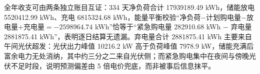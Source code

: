 全年收支可由两条独立账目互证：334 天净负荷合计 17939189.49 kWh，储能放电 5520412.99 kWh、充电 6815324.68 kWh，能量平衡校验“净负荷$-$计划购电量$-$放电量$+$充电量$=-2598964.74$ kWh”恰等于“紧急购电量 282910.68 kWh $-$ 弃电量 2881875.41 kWh”，表明逐日结算无遗漏。弃电量合计 2881875.41 kWh 主要来自午间光伏超发：光伏出力峰值 10216.2 kW 高于负荷峰值 7978.9 kW，储能充满后富余电力无处消纳，其中约三分之二来自光伏侧；而紧急购电集中在夜间与傍晚光伏不足时段，说明预测偏差由 5 倍电价兜底，而非被事后信息抹平。
